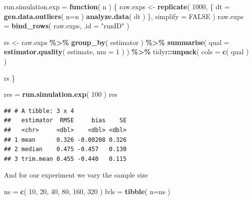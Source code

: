 \documentclass[
]{book}
\newenvironment{Shaded}{\begin{snugshade}}{\end{snugshade}}
\newcommand{\AttributeTok}[1]{\textcolor[rgb]{0.13,0.29,0.53}{#1}}
\newcommand{\ConstantTok}[1]{\textcolor[rgb]{0.56,0.35,0.01}{#1}}
\newcommand{\ControlFlowTok}[1]{\textcolor[rgb]{0.13,0.29,0.53}{\textbf{#1}}}
\newcommand{\DecValTok}[1]{\textcolor[rgb]{0.00,0.00,0.81}{#1}}
\newcommand{\FunctionTok}[1]{\textcolor[rgb]{0.13,0.29,0.53}{\textbf{#1}}}
\newcommand{\NormalTok}[1]{#1}
\newcommand{\OtherTok}[1]{\textcolor[rgb]{0.56,0.35,0.01}{#1}}
\newcommand{\SpecialCharTok}[1]{\textcolor[rgb]{0.81,0.36,0.00}{\textbf{#1}}}
\newcommand{\StringTok}[1]{\textcolor[rgb]{0.31,0.60,0.02}{#1}}
\begin{document}
\begin{Shaded}
\begin{Highlighting}[]
\NormalTok{run.simulation.exp }\OtherTok{=} \ControlFlowTok{function}\NormalTok{( n ) \{}
\NormalTok{    raw.exps }\OtherTok{\textless{}{-}} \FunctionTok{replicate}\NormalTok{( }\DecValTok{1000}\NormalTok{, \{}
\NormalTok{        dt }\OtherTok{=} \FunctionTok{gen.data.outliers}\NormalTok{( }\AttributeTok{n=}\NormalTok{n )}
        \FunctionTok{analyze.data}\NormalTok{( dt )}
\NormalTok{    \}, }\AttributeTok{simplify =} \ConstantTok{FALSE}\NormalTok{ )}
\NormalTok{    raw.exps }\OtherTok{=} \FunctionTok{bind\_rows}\NormalTok{( raw.exps, }\AttributeTok{.id =} \StringTok{"runID"}\NormalTok{ )}

\NormalTok{    rs }\OtherTok{\textless{}{-}}\NormalTok{ raw.exps }\SpecialCharTok{\%\textgreater{}\%}
        \FunctionTok{group\_by}\NormalTok{( estimator ) }\SpecialCharTok{\%\textgreater{}\%}
        \FunctionTok{summarise}\NormalTok{( }\AttributeTok{qual =} \FunctionTok{estimator.quality}\NormalTok{( estimate, }\AttributeTok{mu =} \DecValTok{1}\NormalTok{ ) ) }\SpecialCharTok{\%\textgreater{}\%}
\NormalTok{        tidyr}\SpecialCharTok{::}\FunctionTok{unpack}\NormalTok{( }\AttributeTok{cols =} \FunctionTok{c}\NormalTok{( qual ) )}

\NormalTok{    rs}
\NormalTok{\}}

\NormalTok{res }\OtherTok{=} \FunctionTok{run.simulation.exp}\NormalTok{( }\DecValTok{100}\NormalTok{ )}
\NormalTok{res}
\end{Highlighting}
\end{Shaded}

\begin{verbatim}
## # A tibble: 3 x 4
##   estimator  RMSE     bias    SE
##   <chr>     <dbl>    <dbl> <dbl>
## 1 mean      0.326 -0.00208 0.326
## 2 median    0.475 -0.457   0.130
## 3 trim.mean 0.455 -0.440   0.115
\end{verbatim}

And for our experiment we vary the sample size

\begin{Shaded}
\begin{Highlighting}[]
\NormalTok{ns }\OtherTok{=} \FunctionTok{c}\NormalTok{( }\DecValTok{10}\NormalTok{, }\DecValTok{20}\NormalTok{, }\DecValTok{40}\NormalTok{, }\DecValTok{80}\NormalTok{, }\DecValTok{160}\NormalTok{, }\DecValTok{320}\NormalTok{ )}
\NormalTok{lvls }\OtherTok{=} \FunctionTok{tibble}\NormalTok{( }\AttributeTok{n=}\NormalTok{ns )}
\end{Highlighting}
\end{Shaded}
\end{document}
